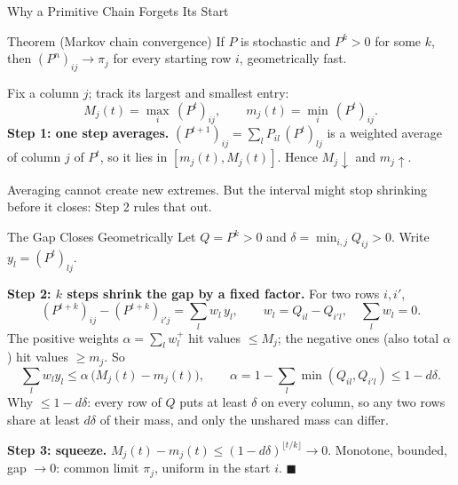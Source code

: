 \documentclass[aspectratio=169,10pt]{beamer}
\begin{document}
\begin{frame}[shrink=0]{Why a Primitive Chain Forgets Its Start}
\begin{block}{Theorem (Markov chain convergence)}
If $P$ is stochastic and $P^k > 0$ for some $k$, then
$(P^n)_{ij} \to \pi_j$ for every starting row $i$, geometrically fast.
\end{block}
Fix a column $j$; track its largest and smallest entry:
\[
M_j(t) = \max_i\, (P^t)_{ij}, \qquad m_j(t) = \min_i\, (P^t)_{ij}.
\]
\textbf{Step 1: one step averages.}
$(P^{t+1})_{ij} = \sum_l P_{il}\,(P^t)_{lj}$ is a weighted average of column $j$ of $P^t$, so it lies in
$[m_j(t), M_j(t)]$. Hence $M_j \downarrow$ and $m_j \uparrow$.
 
\vspace{0.1cm}
{\small Averaging cannot create new extremes. But the interval might stop
shrinking before it closes: Step 2 rules that out.}
\end{frame}
 
\begin{frame}[shrink=0]{The Gap Closes Geometrically}
Let $Q = P^k > 0$ and $\delta = \min_{i,j} Q_{ij} > 0$. Write $y_l = (P^t)_{lj}$.
 
\vspace{0.1cm}
\textbf{Step 2: $k$ steps shrink the gap by a fixed factor.} For two rows $i, i'$,
\[
(P^{t+k})_{ij} - (P^{t+k})_{i'j} = \sum_l w_l\, y_l,
\qquad w_l = Q_{il} - Q_{i'l}, \quad \textstyle\sum_l w_l = 0.
\]
The positive weights $\alpha = \sum_l w_l^+$ hit values $\le M_j$; the
negative ones (also total $\alpha$) hit values $\ge m_j$. So
\[
\sum_l w_l y_l \le \alpha\,\big(M_j(t) - m_j(t)\big), \qquad
\alpha = 1 - \sum_l \min(Q_{il}, Q_{i'l}) \le 1 - d\delta.
\]
{\small Why $\le 1 - d\delta$: every row of $Q$ puts at least $\delta$ on
every column, so any two rows share at least $d\delta$ of their mass, and
only the unshared mass can differ.}
 
\vspace{0.15cm}
\textbf{Step 3: squeeze.}
$M_j(t) - m_j(t) \le (1 - d\delta)^{\lfloor t/k \rfloor} \to 0$.
Monotone, bounded, gap $\to 0$: common limit $\pi_j$, uniform in the start $i$.
\hfill $\blacksquare$
\end{frame}
 
\end{document}
